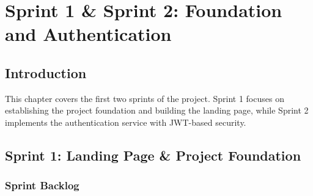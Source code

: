 \chapter{Sprint 1 \& Sprint 2: Foundation and Authentication}

\section{Introduction}

This chapter covers the first two sprints of the project. Sprint 1 focuses on establishing the project foundation and building the landing page, while Sprint 2 implements the authentication service with JWT-based security.

\section{Sprint 1: Landing Page \& Project Foundation}


\subsection{Sprint Backlog}

